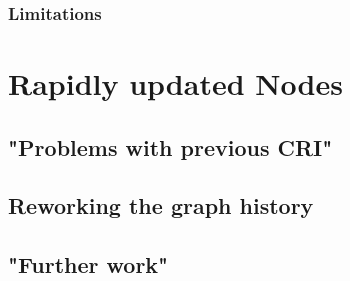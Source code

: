 		\subsubsection{Limitations} 


\section{Rapidly updated Nodes}
	
	\subsection{"Problems with previous CRI"}
	
	\subsection{Reworking the graph history}
	
	\subsection{"Further work"}


